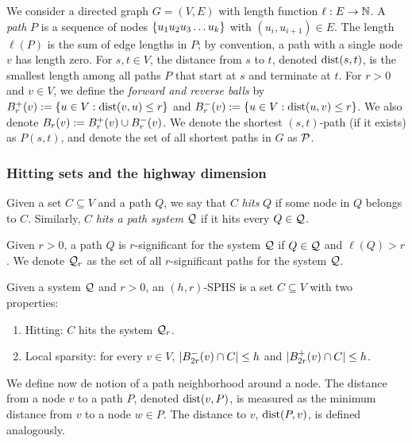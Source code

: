 
We consider a directed graph $G=(V,E)$ with length function $\ell:E\to \N$.
A \emph{path} $P$ is a sequence of nodes $\crl*{u_1u_2u_3\ldots u_k}$ with $(u_i,u_{i+1})\in E$. 
The length $\ell(P)$ is the sum of edge lengths in $P$; by convention, a path with a single node $v$ has length zero.
For $s,t\in V$, the distance from $s$ to $t$, denoted $\dist(s,t)$, is the smallest length among all paths $P$ that start at $s$ and terminate at $t$.
For $r>0$ and $v\in V$, we define the \emph{forward and reverse balls} by $\Bf_r(v):=\{u\in V: \dist(v,u)\leq r\}$ and $\Bb_r(v):=\{u\in V: \dist(u,v)\leq r\}$.
We also denote $B_r(v):=\Bf_r(v)\cup\Bb_r(v)$.
We denote the shortest $(s,t)$-path (if it exists) as $P(s,t)$, and denote the set of all shortest paths in $G$ as $\calP$.


\subsubsection{Hitting sets and the highway dimension}

Given a set $C\subseteq V$ and a path $Q$, we say that $C$ \emph{hits} $Q$ if some node in $Q$ belongs to $C$.
Similarly, $C$ \emph{hits a path system} $\calQ$ if it hits every $Q\in\calQ$.


\begin{definition}
Given $r>0$, a path $Q$ is $r$-significant for the system $\calQ$ if $Q\in\calQ$ and $\ell(Q)>r$.
We denote $\calQ_r$ as the set of all $r$-significant paths for the system $\calQ$.
\end{definition}

\begin{definition}
Given a system $\calQ$ and $r>0$, an $(h,r)$-SPHS is a set $C\subseteq V$ with two properties: 
\begin{enumerate}
\item Hitting: $C$ hits the system $\calQ_r$.
\item Local sparsity: for every $v\in V$, $\card{\Bb_{2r}(v)\cap C}\leq h$ and $\card{\Bf_{2r}(v)\cap C}\leq h$.
\end{enumerate}
\end{definition}

We define now de notion of a path neighborhood around a node.
The distance from a node $v$ to a path $P$, denoted $\dist(v,P)$, is measured as the minimum distance from $v$ to a node $w\in P$.
The distance to $v$, $\dist(P,v)$, is defined analogously.

